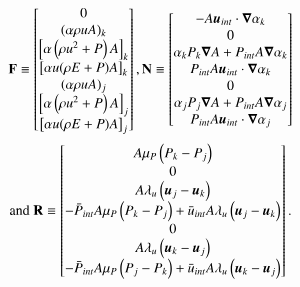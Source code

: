 \documentclass[preprint,10pt]{elsarticle}
\begin{document}
\begin{equation}
  \mathbf{F} \equiv
  \begin{bmatrix}
      0     \\
    ( \alpha \rho u A )_k     \\
    \left[ \alpha \left(\rho u^2 + P \right) A \right ]_k  \\
    \left[ \alpha u (\rho E + P) A \right]_k \\
    ( \alpha \rho u A )_j     \\
    \left[ \alpha \left(\rho u^2 + P \right) A \right ]_j  \\
    \left[ \alpha u (\rho E + P) A \right]_j    
  \end{bmatrix},
  \mathbf{N} \equiv
  \begin{bmatrix}
      - A \boldsymbol u_{int} \cdot \boldsymbol\nabla \alpha_k     \\
    0     \\
    \alpha_k P_k \boldsymbol\nabla A + P_{int} A \boldsymbol\nabla \alpha_k  \\
    P_{int} A \boldsymbol u_{int} \cdot \boldsymbol\nabla \alpha_k \\
    0     \\
    \alpha_j P_j \boldsymbol\nabla A + P_{int} A \boldsymbol\nabla \alpha_j  \\
    P_{int} A \boldsymbol u_{int} \cdot \boldsymbol\nabla \alpha_j    
  \end{bmatrix} \nonumber
\end{equation}
\begin{equation}
\text{and }
  \mathbf{R} \equiv
  \begin{bmatrix}
      A \mu_P \left( P_k - P_j \right)     \\
    0     \\
    A \lambda_u \left( \boldsymbol u_j - \boldsymbol u_k \right) \\
    - \bar{P}_{int} A \mu_P \left( P_k - P_j \right) + \bar{u}_{int} A \lambda_u \left( \boldsymbol u_j - \boldsymbol u_k \right) \\
    0     \\
    A \lambda_u \left( \boldsymbol u_k - \boldsymbol u_j \right) \\
    - \bar{P}_{int} A \mu_P \left( P_j - P_k \right) + \bar{u}_{int} A \lambda_u \left( \boldsymbol u_k - \boldsymbol u_j \right)    
  \end{bmatrix}. \nonumber
\end{equation}
%
\end{document}
